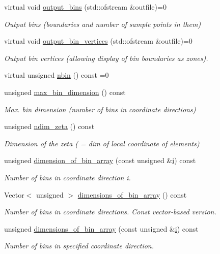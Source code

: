 \begin{DoxyCompactItemize}
virtual void \hyperlink{classBinArray_a66fe7e379a53e3fee81ead7ef4045b40}{output\+\_\+bins} (std\+::ofstream \&outfile)=0
\begin{DoxyCompactList}\small\item\em Output bins (boundaries and number of sample points in them) \end{DoxyCompactList}\item 
virtual void \hyperlink{classBinArray_afc595a05f2ab19e1bb973c5a076b1432}{output\+\_\+bin\+\_\+vertices} (std\+::ofstream \&outfile)=0
\begin{DoxyCompactList}\small\item\em Output bin vertices (allowing display of bin boundaries as zones). \end{DoxyCompactList}\item 
virtual unsigned \hyperlink{classBinArray_aad085bf99d78162120c419f7504d256b}{nbin} () const =0
\item 
unsigned \hyperlink{classBinArray_a1bd867e26195feb7ae95a8e77acadca8}{max\+\_\+bin\+\_\+dimension} () const
\begin{DoxyCompactList}\small\item\em Max. bin dimension (number of bins in coordinate directions) \end{DoxyCompactList}\item 
unsigned \hyperlink{classBinArray_a8e0c4a67385d7dcc714de95ce9965f34}{ndim\+\_\+zeta} () const
\begin{DoxyCompactList}\small\item\em Dimension of the zeta ( = dim of local coordinate of elements) \end{DoxyCompactList}\item 
unsigned \hyperlink{classBinArray_a0148631c80ef91ad21b985986ae24394}{dimension\+\_\+of\+\_\+bin\+\_\+array} (const unsigned \&\hyperlink{cfortran_8h_adb50e893b86b3e55e751a42eab3cba82}{i}) const
\begin{DoxyCompactList}\small\item\em Number of bins in coordinate direction i. \end{DoxyCompactList}\item 
Vector$<$ unsigned $>$ \hyperlink{classBinArray_a527596c024da9b9baf817778af18704a}{dimensions\+\_\+of\+\_\+bin\+\_\+array} () const
\begin{DoxyCompactList}\small\item\em Number of bins in coordinate directions. Const vector-\/based version. \end{DoxyCompactList}\item 
unsigned \hyperlink{classBinArray_a7814241e3fa3da0f5449a85a6d0d2ee1}{dimensions\+\_\+of\+\_\+bin\+\_\+array} (const unsigned \&\hyperlink{cfortran_8h_adb50e893b86b3e55e751a42eab3cba82}{i}) const
\begin{DoxyCompactList}\small\item\em Number of bins in specified coordinate direction. \end{DoxyCompactList}\end{DoxyCompactItemize}
